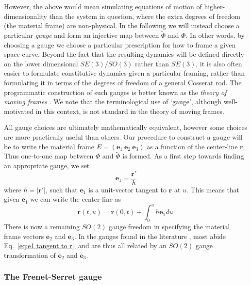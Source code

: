 However, the above would mean simulating equations of motion of higher-dimensionality than the system in question, where the extra degrees of freedom (the material frame) are non-physical. In the following we will instead choose a particular \textit{gauge} and form an injective map between $\tilde{\Phi}$ and $\Phi$. In other words, by choosing a gauge we choose a particular prescription for how to frame a given space-curve. Beyond the fact that the resulting dynamics will be defined directly on the lower dimensional $SE(3)/SO(3)$ rather than $SE(3)$, it is also often easier to formulate constitutive dynamics given a particular framing, rather than formulating it in terms of the degrees of freedom of a general Cosserat rod. The programmatic construction of such gauges is better known as the \textit{theory of moving frames} \citep{cartanTheorieGroupesFinis1938, levyReviewElieCartan1935}. We note that the terminological use of `gauge', although well-motivated in this context, is not standard in the theory of moving frames.

All gauge choices are ultimately mathematically equivalent, however some choices are more practically useful than others. Our procedure to construct a gauge will be to write the material frame $E = (\mathbf{e}_1\ \mathbf{e}_2\ \mathbf{e}_3)$ as a function of the center-line $\mathbf{r}$. Thus one-to-one map between $\Phi$ and $\tilde{\Phi}$ is formed. As a first step towards finding an appropriate gauge, we set
\begin{equation} \label{eq:e1 tangent to r}
\mathbf{e}_1 = \frac{\mathbf{r}'}{h}
\end{equation}
where $h = |\mathbf{r}'|$, such that $\mathbf{e}_1$ is a unit-vector tangent to $\mathbf{r}$ at $u$. This means that given $\mathbf{e}_1$ we can write the center-line as
\begin{equation} \label{eq:r from e1}
\mathbf{r}(t, u) = \mathbf{r}(0, t) + \int_0^u h \mathbf{e}_1 du.
\end{equation} 
There is now a remaining $SO(2)$ gauge freedom in specifying the material frame vectors $\mathbf{e}_2$ and $\mathbf{e}_3$. In the gauges found in the literature \citep{bishopThereMoreOne1975a, mansfieldUseRotationMinimizing2019, clellandFrenetCartanMethod2017, carrollImprovingFrenetFrame2013, seligCharacterisationFrenetSerret2013}, most abide Eq.~\ref{eq:e1 tangent to r}, and are thus all related by an $SO(2)$ gauge transformation of $\mathbf{e}_2$ and $\mathbf{e}_3$.

\subsubsection*{The Frenet-Serret gauge}

